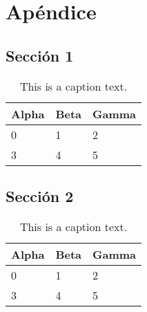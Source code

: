 
\chapter{Apéndice}
\label{sec:appendix}

{
\color{gray}
\Blindtext[1][1]
}

\section{Sección 1}
\label{sec:appendix:sec1}

{
\color{gray}
\Blindtext[1][1]

\begin{table}[h]
	\begin{tabularx}{\textwidth}{X | X | X}
		Alpha		& Beta			& Gamma			\\ \hline
		0			& 1				& 2				\\ \hline
		3			& 4				& 5				\\ %
	\end{tabularx}
	\label{tab:table1}
	\caption{This is a caption text.}
\end{table}
}

\section{Sección 2}
\label{sec:appendix:sec2}


{
\color{gray}
\Blindtext[1][1]

\begin{table}[h]
	\begin{tabularx}{\textwidth}{X | X | X}
		Alpha		& Beta			& Gamma			\\ \hline
		0			& 1				& 2				\\ \hline
		3			& 4				& 5				\\ %
	\end{tabularx}
	\label{tab:table2}
	\caption{This is a caption text.}
\end{table}


\Blindtext[1][2]
}